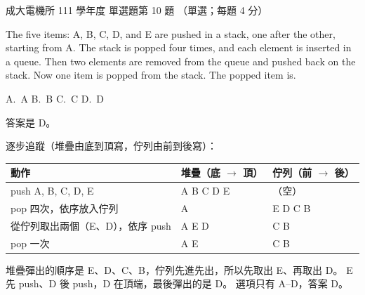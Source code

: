 \begin{pastexam}[label={px:ncku-111-ee-ds-10}]{成大電機所 111 學年度 單選題第 10 題}
（單選；每題 4 分）

The five items: A, B, C, D, and E are pushed in a stack, one after the other, starting from A. The stack is
popped four times, and each element is inserted in a queue. Then two elements are removed from the queue and
pushed back on the stack. Now one item is popped from the stack. The popped item is.

A.~A \qquad B.~B \qquad C.~C \qquad D.~D
\end{pastexam}

\begin{pastsoln}
答案是 D。

逐步追蹤（堆疊由底到頂寫，佇列由前到後寫）：
\begin{center}
\begin{tabular}{lll}
\toprule
動作 & 堆疊（底 $\to$ 頂） & 佇列（前 $\to$ 後） \\
\midrule
push A, B, C, D, E & A B C D E & （空） \\
pop 四次，依序放入佇列 & A & E D C B \\
從佇列取出兩個（E、D），依序 push & A E D & C B \\
pop 一次 & A E & C B \\
\bottomrule
\end{tabular}
\end{center}
堆疊彈出的順序是 E、D、C、B，佇列先進先出，所以先取出 E、再取出 D。 E 先 push、D 後 push，D 在頂端，最後彈出的是
D。 選項只有 A--D，答案 D。
\end{pastsoln}
